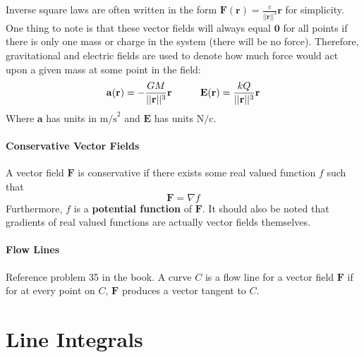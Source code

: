 \documentclass{article}
\begin{document}
Inverse square laws are often written in the form $\mathbf{F}(\mathbf{r}) = \frac{c}{||\mathbf{r}||^3}\mathbf{r}$ for simplicity. One thing to note is that these vector fields will always equal $\mathbf{0}$ for all points if there is only one mass or charge in the system (there will be no force). Therefore, gravitational and electric fields are used to denote how much force would act upon a given mass at some point in the field:
\[ \mathbf{a(r)} = -\frac{GM}{||\mathbf{r}||^3}\mathbf{r} \hspace{.4in} \mathbf{E(r)} = \frac{kQ}{||\mathbf{r}||^3}\mathbf{r}\]
Where $\mathbf{a}$ has units in $\mathrm{m/s}^2$ and $\mathbf{E}$ has units $\mathrm{N/c}$.

\paragraph{Conservative Vector Fields} A vector field $\mathbf{F}$ is conservative if there exists some real valued function $f$ such that
\[ \mathbf{F} = \nabla f\]
Furthermore, $f$ is a \textbf{potential function} of $\mathbf{F}$. It should also be noted that gradients of real valued functions are actually vector fields themselves.

\paragraph{Flow Lines} Reference problem 35 in the book. A curve $C$ is a flow line for a vector field $\mathbf{F}$ if for at every point on $C$, $\mathbf{F}$ produces a vector tangent to $C$.


\section*{Line Integrals}
\end{document}
